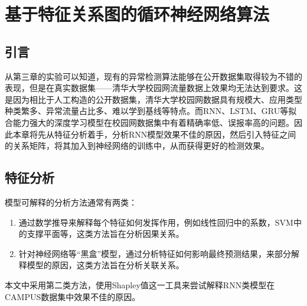 
\chapter{基于特征关系图的循环神经网络算法}
\section{引言}
从第三章的实验可以知道，现有的异常检测算法能够在公开数据集取得较为不错的表现，但是在真实数据集——清华大学校园网流量数据上效果均无法达到要求。这是因为相比于人工构造的公开数据集，清华大学校园网数据具有规模大、应用类型种类繁多、异常流量占比多、难以学到基线等特点。而RNN、LSTM、GRU等拟合能力强大的深度学习模型在校园网数据集中有着精确率低、误报率高的问题。因此本章将先从特征分析着手，分析RNN模型效果不佳的原因，然后引入特征之间的关系矩阵，将其加入到神经网络的训练中，从而获得更好的检测效果。

\section{特征分析}
模型可解释的分析方法通常有两类：
\begin{enumerate}
  \item 通过数学推导来解释每个特征如何发挥作用，例如线性回归中的系数，SVM中的支撑平面等，这类方法旨在分析因果关系。
  \item 针对神经网络等“黑盒”模型，通过分析特征如何影响最终预测结果，来部分解释模型的原因，这类方法旨在分析关联关系。
\end{enumerate}
本文中采用第二类方法，使用Shapley值这一工具来尝试解释RNN类模型在CAMPUS数据集中效果不佳的原因。






